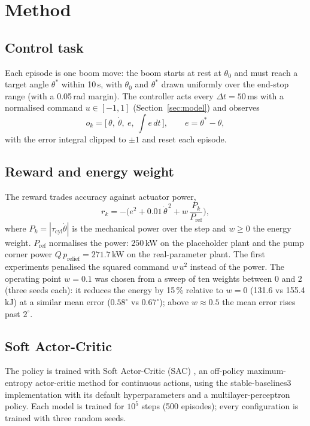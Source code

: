 \section{Method}
\label{sec:method}

\subsection{Control task}
Each episode is one boom move: the boom starts at rest at $\theta_0$ and must reach a
target angle $\theta^*$ within 10\,s, with $\theta_0$ and $\theta^*$ drawn uniformly over the
end-stop range (with a 0.05\,rad margin). The controller acts every $\Delta t=50$\,ms with a
normalised command $u\in[-1,1]$ (Section~\ref{sec:model}) and observes
\begin{equation}
o_k = \big[\,\theta,\ \dot\theta,\ e,\ \textstyle\int e\,dt\,\big],\qquad e=\theta^*-\theta,
\label{eq:obs}
\end{equation}
with the error integral clipped to $\pm1$ and reset each episode.

\subsection{Reward and energy weight}
The reward trades accuracy against actuator power,
\begin{equation}
r_k = -\Big(e^2 + 0.01\,\dot\theta^{\,2} + w\,\frac{P_k}{P_\mathrm{ref}}\Big),
\label{eq:reward}
\end{equation}
where $P_k=|\tau_\mathrm{cyl}\dot\theta|$ is the mechanical power over the step and $w\ge0$ the
energy weight. $P_\mathrm{ref}$ normalises the power: $250$\,kW on the placeholder plant and the
pump corner power $Q\,p_\mathrm{relief}=271.7$\,kW on the real-parameter plant.
The first experiments penalised the squared command $w\,u^2$ instead of the power.
The operating point $w=0.1$ was chosen from a sweep of ten weights between 0 and 2
(three seeds each): it reduces the energy by 15\,\% relative to $w=0$
(131.6 vs 155.4\,kJ) at a similar mean error ($0.58^\circ$ vs $0.67^\circ$);
above $w\approx0.5$ the mean error rises past $2^\circ$.

\subsection{Soft Actor-Critic}
The policy is trained with Soft Actor-Critic (SAC) \cite{haarnoja2018sac}, an off-policy
maximum-entropy actor-critic method for continuous actions, using the stable-baselines3
implementation \cite{raffin2021sb3} with its default hyperparameters and a multilayer-perceptron
policy. Each model is trained for $10^5$ steps (500 episodes); every configuration is trained
with three random seeds.

